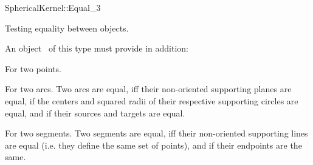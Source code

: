 \begin{ccRefFunctionObjectConcept}{SphericalKernel::Equal_3}

\ccDefinition

Testing equality between objects.

\ccRefines



An object \ccVar\ of this type must provide in addition:

{For two points.}

{For two arcs. Two arcs are equal, iff their non-oriented
  supporting planes are equal, if the centers and squared
  radii of their respective supporting circles are equal, and if their
  sources and targets are equal.}

{For two segments. Two segments are equal, iff their non-oriented
  supporting lines are equal (i.e. they define the same set of
  points), and if their endpoints are the same.}

\ccSeeAlso

\\
\\
\\
\\

\end{ccRefFunctionObjectConcept}
